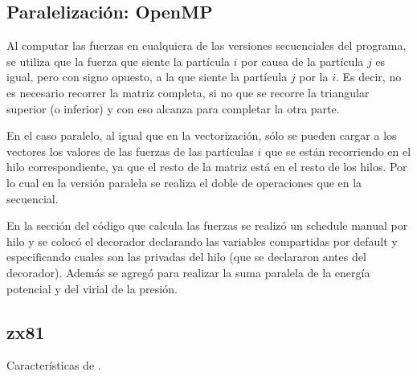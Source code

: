 \documentclass[a4paper,spanish,12pt,twoside]{article}
\begin{document}
\subsection{Paralelización: OpenMP}

Al computar las fuerzas en cualquiera de las versiones secuenciales del programa, se utiliza que la fuerza que siente la partícula $i$ por causa de la partícula $j$ es igual, pero con signo opuesto, a la que siente la partícula $j$ por la $i$. Es decir, no es necesario recorrer la matriz completa, si no que se recorre la triangular superior (o inferior) y con eso alcanza para completar la otra parte.

En el caso paralelo, al igual que en la vectorización, sólo se pueden cargar a los vectores los valores de las fuerzas de las partículas $i$ que se están recorriendo en el hilo correspondiente, ya que el resto de la matriz está en el resto de los hilos. Por lo cual en la versión paralela se realiza el doble de operaciones que en la secuencial.

En la sección del código que calcula las fuerzas se realizó un schedule manual por hilo y se colocó el decorador  declarando las variables compartidas por default y especificando cuales son las privadas del hilo (que se declararon antes del decorador). Además se agregó  para realizar la suma paralela de la energía potencial y del virial de la presión.


\clearpage
\pagebreak

\begin{appendices}
	\section{zx81}\label{app:zx81}
	Características de .
\end{appendices}
\end{document}
